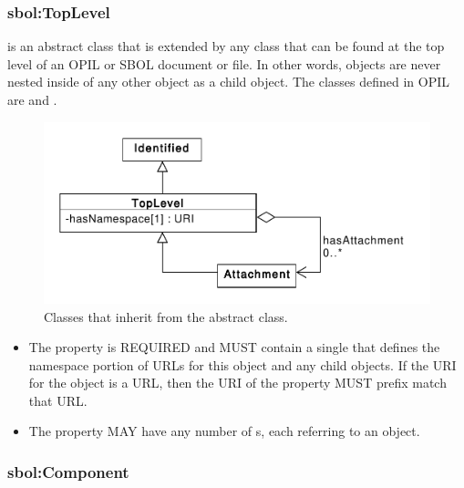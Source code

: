 \subsubsection{sbol:TopLevel}
\label{sec:sbol:TopLevel}

 is an abstract class that is extended by any  class that can be found at the top level of an OPIL or SBOL document or file.
In other words,  objects are never nested inside of any other object as a child object.
The  classes defined in OPIL are  and . 

\begin{figure}[ht]
\begin{center}
\includegraphics[scale=0.6]{sbol_uml/toplevel}
\caption[]{Classes that inherit from the  abstract class.}
\label{uml:toplevel}
\end{center}
\end{figure}

\begin{itemize}
\item \label{sec:sbol:hasNamespace}
The  property is REQUIRED and MUST contain a single  that defines the namespace portion of URLs for this object and any child objects.
If the URI for the  object is a URL, then the URI of the  property MUST prefix match that URL.

\item 
\label{sec:sbol:hasAttachment}
The  property MAY have any number of s, each referring to an  object.
\end{itemize}


\subsubsection{sbol:Component}
\label{sec:sbol:Component}

